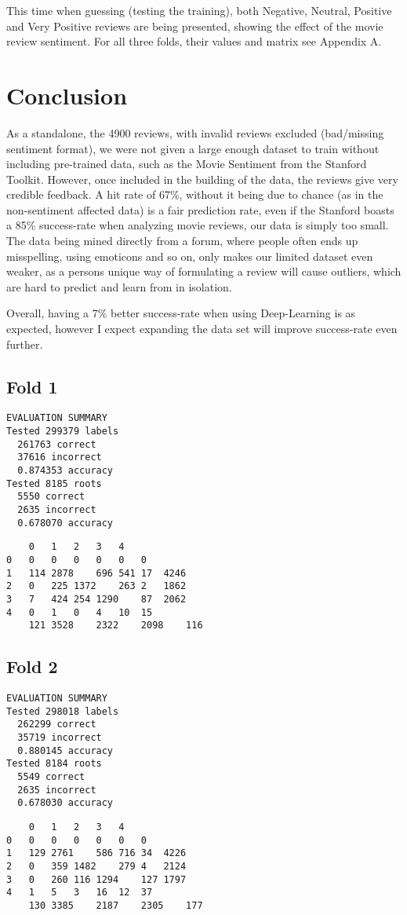 \documentclass{sig-alternate}
\begin{document}
This time when guessing (testing the training), both Negative, Neutral, Positive and Very Positive reviews are being presented, showing the effect of the movie review sentiment. For all three folds, their values and matrix see Appendix A.
\section{Conclusion}
As a standalone, the 4900 reviews, with invalid reviews excluded (bad/missing sentiment format), we were not given a large enough dataset to train without including pre-trained data, such as the Movie Sentiment from the Stanford Toolkit. However, once included in the building of the data, the reviews give very credible feedback. A hit rate of 67\%, without it being due to chance (as in the non-sentiment affected data) is a fair prediction rate, even if the Stanford boasts a 85\% success-rate when analyzing movie reviews, our data is simply too small. The data being mined directly from a forum, where people often ends up misspelling, using emoticons and so on, only makes our limited dataset even weaker, as a persons unique way of formulating a review will cause outliers, which are hard to predict and learn from in isolation.

Overall, having a 7\% better success-rate when using Deep-Learning is as expected, however I expect expanding the data set will improve success-rate even further.
{}  %

\balancecolumns
\appendix
\label{appendix}
\subsection*{Fold 1}
\begin{lstlisting}
EVALUATION SUMMARY
Tested 299379 labels
  261763 correct
  37616 incorrect
  0.874353 accuracy
Tested 8185 roots
  5550 correct
  2635 incorrect
  0.678070 accuracy
\end{lstlisting}
\begin{lstlisting}
	0	1	2	3	4
0	0	0	0	0	0	0
1	114	2878	696	541	17	4246
2	0	225	1372	263	2	1862
3	7	424	254	1290	87	2062
4	0	1	0	4	10	15
	121	3528	2322	2098	116
\end{lstlisting}
\subsection*{Fold 2}
\begin{lstlisting}
EVALUATION SUMMARY
Tested 298018 labels
  262299 correct
  35719 incorrect
  0.880145 accuracy
Tested 8184 roots
  5549 correct
  2635 incorrect
  0.678030 accuracy
\end{lstlisting}
\begin{lstlisting}
	0	1	2	3	4	
0	0	0	0	0	0	0
1	129	2761	586	716	34	4226
2	0	359	1482	279	4	2124
3	0	260	116	1294	127	1797
4	1	5	3	16	12	37
	130	3385	2187	2305	177
\end{lstlisting}
\end{document}
